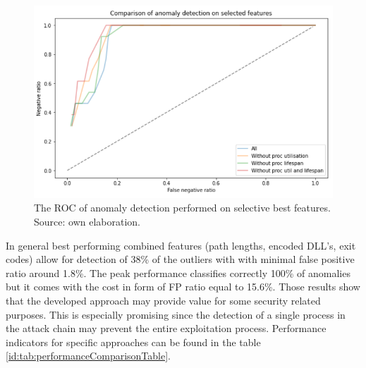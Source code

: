 \documentclass[a4paper,twoside,12pt]{book}
\begin{document}
\begin{figure}
	\centering
	\includegraphics[scale=0.9]{images/CombinedFinalROCDroping2}
	\caption{The ROC of anomaly detection performed on selective best features. Source: own elaboration.}
	\label{fig:combinedCompFinalROCDroping}
 \end{figure}

In general best performing combined features (path lengths, encoded DLL's, exit codes) allow for detection of 38\% of the 
outliers with with minimal false positive ratio around 1.8\%. The peak performance 
classifies correctly 100\% of anomalies but it comes with the cost in form of FP ratio equal to 15.6\%.
Those results show that the developed approach may provide value for some 
security related purposes. This is especially promising since the detection of a single process in the attack chain may 
prevent the entire exploitation process. Performance indicators for specific approaches can be found in the table \ref{id:tab:performanceComparisonTable}.
\end{document}
